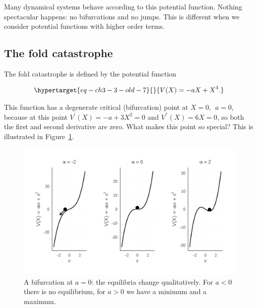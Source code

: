 \documentclass[
  a4paper,
  DIV=11,
  numbers=noendperiod,
  oneside]{scrreprt}
\begin{document}
Many dynamical systems behave according to this potential function.
Nothing spectacular happens: no bifurcations and no jumps. This is
different when we consider potential functions with higher order terms.

\hypertarget{sec-The-fold-catastrophe}{%
\subsection{The fold catastrophe}\label{sec-The-fold-catastrophe}}

The fold catastrophe is defined by the potential function

\begin{equation}\protect\hypertarget{eq-ch3-3-old-7}{}{
V(X) = {- aX + X}^{3}.
}\label{eq-ch3-3-old-7}\end{equation}

This function has a degenerate critical (bifurcation) point at
\(X = 0,\ \ a = 0\), because at this point
\(V^{'}(X) = - a + 3X^{2} = 0\) and \(V^{''}(X) = 6X = 0\), so both the
first and second derivative are zero. What makes this point so special?
This is illustrated in Figure~\ref{fig-ch3-img4-old-16}.

\begin{figure}

{\centering \includegraphics{media/ch3/fig-ch3-img4-old-16.jpg}

}

\caption{\label{fig-ch3-img4-old-16}A bifurcation at \(a = 0\): the
equilibria change qualitatively. For \(a<0\) there is no equilibrium,
for \(a>0\) we have a minimum and a maximum.}

\end{figure}
\end{document}
